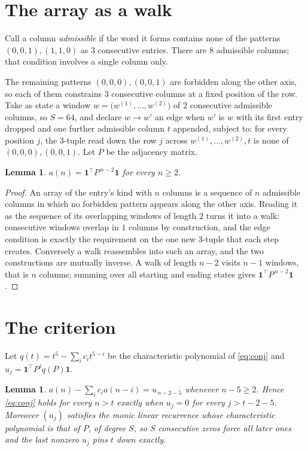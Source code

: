 \documentclass[11pt,a4paper]{article}
\theoremstyle{plain}
\newtheorem{lemma}[theorem]{Lemma}
\theoremstyle{definition}
\begin{document}
\section{The array as a walk}

Call a column \emph{admissible} if the word it forms contains none of the patterns
$(0,0,1), (1,1,0)$ as $3$ consecutive entries. There are $8$ admissible columns; that condition
involves a single column only.

The remaining patterns $(0,0,0), (0,0,1)$ are forbidden along the other axis, so each of them
constrains $3$ consecutive columns at a fixed position of the row. Take as state a
window $w=\bigl(w^{(1)},\dots,w^{(2)}\bigr)$ of $2$ consecutive admissible
columns, so $S=64$, and declare $w\to w'$ an edge when $w'$ is $w$ with its first entry
dropped and one further admissible column $t$ appended, subject to: for every position
$j$, the $3$-tuple read down the row $j$ across $w^{(1)},\dots,w^{(2)},t$
is none of $(0,0,0), (0,0,1)$. Let $P$ be the adjacency matrix.

\begin{lemma}\label{lem:walk}
$a(n)=\mathbf{1}^{\!\top}P^{\,n-2}\mathbf{1}$ for every $n\ge2$.
\end{lemma}

\begin{proof}
An array of the entry's kind with $n$ columns is a sequence of $n$ admissible columns in
which no forbidden pattern appears along the other axis. Reading it as the sequence of its
overlapping windows of length $2$ turns it into a walk: consecutive windows overlap in
$1$ columns by construction, and the edge condition is exactly the requirement on the one
new $3$-tuple that each step creates. Conversely a walk reassembles into such an array,
and the two constructions are mutually inverse. A walk of length $n-2$ visits $n-1$
windows, that is $n$ columns; summing over all starting and ending states gives
$\mathbf{1}^{\!\top}P^{\,n-2}\mathbf{1}$.
\end{proof}

\section{The criterion}

Let $q(t)=t^{5}-\sum_i c_i t^{5-i}$ be the characteristic polynomial of
\eqref{eq:conj} and $u_j=\mathbf{1}^{\!\top}P^{j}q(P)\mathbf{1}$.

\begin{lemma}\label{lem:crit}
$a(n)-\sum_i c_i a(n-i)=u_{\,n-2-5}$ whenever $n-5\ge2$. Hence
\eqref{eq:conj} holds for every $n>t$ exactly when $u_j=0$ for every
$j>t-2-5$. Moreover $(u_j)$ satisfies the monic linear recurrence whose
characteristic polynomial is that of $P$, of degree $S$, so $S$ consecutive zeros force all
later ones and the last nonzero $u_j$ pins $t$ down exactly.
\end{lemma}
\end{document}
